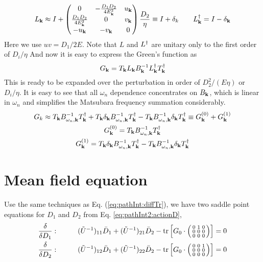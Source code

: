 \begin{equation}\label{eq:pathInt2:L1}
L_{\mathbf{k}}\approx{}I+
\begin{pmatrix}0&-\frac{D_{1}{}D_{2}{}}{4E^{2}_{\mathbf{k}}}&u_{\mathbf{k}}\\
\frac{D_{1}{}D_{2}{}}{4E^{2}_{\mathbf{k}}}&0&v_{\mathbf{k}}\\
-u_{\mathbf{k}}&-v_{\mathbf{k}}&0
\end{pmatrix}\frac{D_{2}{}}{\eta}
\equiv{}I+\delta_{k}\qquad
L^{\dagger}_{\mathbf{k}}=I-\delta_{\mathbf{k}}
\end{equation}
Here we use $uv=D_{1}/2E$.    Note that $L$ and $L^{\dagger}$ are unitary only to the first order of $D_{i}/\eta$
And now it is easy to express the Green's function as
\begin{equation}
G_{\mathbf{k}}=T_{\mathbf{k}}L_{\mathbf{k}}B_{\mathbf{k}}^{-1}L_{\mathbf{k}}^{\dagger}T_{\mathbf{k}}^{\dagger}
\end{equation}
This is ready to be expanded over the perturbation in order of  $D_{2}^{2}/(E\eta)$ or $D_{i}/\eta$.  It is easy to see that all $\omega_{n}$ dependence concentrates on $B_{\mathbf{k}}$, which is linear in $\omega_{n}$  and simplifies the Matsubara frequency summation considerably.   
\begin{subequations}\label{eq:pathInt2:Gexpand}
\begin{gather}
G_{k}\approx{}T_{\mathbf{k}}B_{\omega_{n},\mathbf{k}}^{-1}T_{\mathbf{k}}^{\dagger}+T_{\mathbf{k}}\delta_{\mathbf{k}}B_{\omega_{n},\mathbf{k}}^{-1}T_{\mathbf{k}}^{\dagger}
	-T_{\mathbf{k}}B_{\omega_{n},\mathbf{k}}^{-1}\delta_{\mathbf{k}}T_{\mathbf{k}}^{\dagger}
	\equiv{}G_{\mathbf{k}}^{(0)}+G_{\mathbf{k}}^{(1)}\\
	G_{\mathbf{k}}^{(0)}=T_{\mathbf{k}}B_{\omega_{n},\mathbf{k}}^{-1}T_{\mathbf{k}}^{\dagger}\\
	G_{\mathbf{k}}^{(1)}=T_{\mathbf{k}}\delta_{\mathbf{k}}B_{\omega_{n},\mathbf{k}}^{-1}T_{\mathbf{k}}^{\dagger}
	-T_{\mathbf{k}}B_{\omega_{n},\mathbf{k}}^{-1}\delta_{\mathbf{k}}T_{\mathbf{k}}^{\dagger}
\end{gather}
\end{subequations}

\section{Mean field equation \label{sec:pathInt2:meanfield}}
Use the same techniques as Eq. (\ref{eq:pathInt:diffTr}), we have two saddle point equations for $D_{1}$ and $D_{2}$ from Eq. \eqref{eq:pathInt2:actionD},
 \begin{align}
\frac{\delta}{\delta{}D_{1}}:&\qquad&
(\tilde{U}^{-1})_{11}\bar{D}_{1}+(\tilde{U}^{-1})_{21}\bar{D}_{2}-\text{tr}\left[{G_{0}}\cdot\left(\begin{smallmatrix}0&1&0\\0&0&0\\0&0&0\end{smallmatrix}\right)\right]=0
\label{eq:pathInt2:mf01}\\
\frac{\delta}{\delta{}D_{2}}:&\qquad&
(\tilde{U}^{-1})_{12}\bar{D}_{1}+(\tilde{U}^{-1})_{22}\bar{D}_{2}-\text{tr}\left[{G_{0}}\cdot\left(\begin{smallmatrix}0&0&1\\0&0&0\\0&0&0\end{smallmatrix}\right)\right]=0
\label{eq:pathInt2:mf02}
 \end{align}
 
